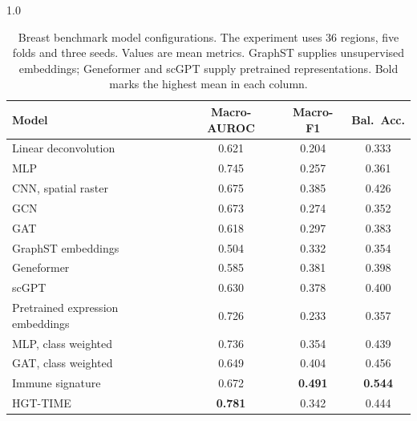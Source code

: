 \begin{table}[!htbp]
\centering
\caption{Breast benchmark model configurations. The experiment uses 36 regions, five folds
and three seeds. Values are mean metrics. GraphST supplies unsupervised
embeddings; Geneformer and scGPT supply pretrained representations. Bold marks the highest
mean in each column.}
\label{tab:breast}
\begin{spacing}{1.0}\normalsize
\setlength{\tabcolsep}{4pt}\renewcommand{\arraystretch}{1.2}
\begin{tabularx}{\linewidth}{@{}Xccc@{}}
\toprule Model & Macro-AUROC & Macro-F1 & Bal.\ Acc. \\
\midrule
Linear deconvolution & 0.621 & 0.204 & 0.333 \\
MLP & 0.745 & 0.257 & 0.361 \\
CNN, spatial raster & 0.675 & 0.385 & 0.426 \\
GCN & 0.673 & 0.274 & 0.352 \\
GAT & 0.618 & 0.297 & 0.383 \\
GraphST embeddings & 0.504 & 0.332 & 0.354 \\
Geneformer & 0.585 & 0.381 & 0.398 \\
scGPT & 0.630 & 0.378 & 0.400 \\
Pretrained expression embeddings & 0.726 & 0.233 & 0.357 \\
MLP, class weighted & 0.736 & 0.354 & 0.439 \\
GAT, class weighted & 0.649 & 0.404 & 0.456 \\
Immune signature & 0.672 & \textbf{0.491} & \textbf{0.544} \\
HGT-TIME & \textbf{0.781} & 0.342 & 0.444 \\
\bottomrule
\end{tabularx}
\end{spacing}
\end{table}
